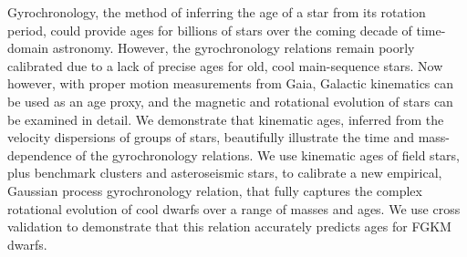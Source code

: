 
Gyrochronology, the method of inferring the age of a star from its rotation
period, could provide ages for billions of stars over the coming decade of
time-domain astronomy.
However, the gyrochronology relations remain poorly calibrated due to a lack
of precise ages for old, cool main-sequence stars.
Now however, with proper motion measurements from Gaia, Galactic kinematics
can be used as an age proxy, and the magnetic and rotational evolution of
stars can be examined in detail.
We demonstrate that kinematic ages, inferred from the velocity dispersions of
groups of stars, beautifully illustrate the time and mass-dependence of the
gyrochronology relations.
We use kinematic ages of field stars, plus benchmark clusters and
asteroseismic stars, to calibrate a new empirical, Gaussian process
gyrochronology relation, that fully captures the complex rotational evolution
of cool dwarfs over a range of masses and ages.
We use cross validation to demonstrate that this relation accurately predicts
ages for FGKM dwarfs.
